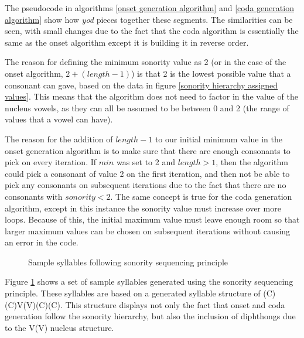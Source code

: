 \documentclass{report}
\begin{document}
	The pseudocode in algorithms \ref{onset generation algorithm} and \ref{coda generation algorithm} show how \textit{yod} pieces together these segments. The similarities can be seen, with small changes due to the fact that the coda algorithm is essentially the same as the onset algorithm except it is building it in reverse order.
	
	The reason for defining the minimum sonority value as 2 (or in the case of the onset algorithm, $2 + (length - 1)$) is that 2 is the lowest possible value that a consonant can gave, based on the data in figure \ref{sonority hierarchy assigned values}. This means that the algorithm does not need to factor in the value of the nucleus vowels, as they can all be assumed to be between 0 and 2 (the range of values that a vowel can have).
	
	The reason for the addition of $length - 1$ to our initial minimum value in the onset generation algorithm is to make sure that there are enough consonants to pick on every iteration. If $min$ was set to 2 and $length > 1$, then the algorithm could pick a consonant of value 2 on the first iteration, and then not be able to pick any consonants on subsequent iterations due to the fact that there are no consonants with $sonority < 2$. The same concept is true for the coda generation algorithm, except in this instance the sonority value must increase over more loops. Because of this, the initial maximum value must leave enough room so that larger maximum values can be chosen on subsequent iterations without causing an error in the code.
	
		
	\begin{figure}
		\caption{Sample syllables following sonority sequencing principle}
		\label{sample syllables using sonority sequencing principle}  
		\begin{tcolorbox}
		\end{tcolorbox}
	\end{figure}

	Figure \ref{sample syllables using sonority sequencing principle} shows a set of sample syllables generated using the sonority sequencing principle. These syllables are based on a generated syllable structure of (C)(C)V(V)(C)(C). This structure displays not only the fact that onset and coda generation follow the sonority hierarchy, but also the inclusion of diphthongs due to the V(V) nucleus structure.
	
\end{document}
